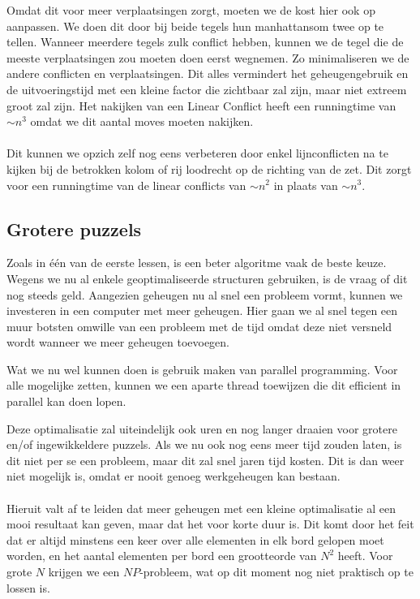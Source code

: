\documentclass[a4paper]{article}
\numberwithin{equation}{section}
\begin{document}
        Omdat dit voor meer verplaatsingen zorgt, moeten we de kost hier ook op aanpassen. We doen dit door bij beide tegels hun manhattansom twee op te tellen. 
        Wanneer meerdere tegels zulk conflict hebben,
        kunnen we de tegel die de meeste verplaatsingen zou moeten doen eerst wegnemen. Zo minimaliseren we de andere conflicten en verplaatsingen. Dit alles vermindert het geheugengebruik en de uitvoeringstijd
        met een kleine factor die zichtbaar zal zijn, maar niet extreem groot zal zijn. Het nakijken van een Linear Conflict heeft een runningtime van $\sim n^3$ omdat we dit aantal moves moeten nakijken.
        \\
        \\Dit kunnen we opzich zelf nog eens verbeteren door enkel lijnconflicten na te kijken bij de betrokken kolom of rij loodrecht op de richting van de zet. Dit zorgt voor een runningtime van de linear conflicts van $\sim n^2$ in plaats van $\sim n^3$. 
    \pagebreak

    \subsection{Grotere puzzels}
    Zoals in \'e\'en van de eerste lessen, is een beter algoritme vaak de beste keuze. Wegens we nu al enkele geoptimaliseerde structuren gebruiken, is de vraag of dit nog steeds geld.
    Aangezien geheugen nu al snel een probleem vormt, kunnen we investeren in een computer met meer geheugen. Hier gaan we al snel tegen een muur botsten omwille van een probleem met de tijd omdat deze niet versneld wordt wanneer we meer geheugen toevoegen.
    
    Wat we nu wel kunnen doen is gebruik maken van parallel programming. Voor alle mogelijke zetten, kunnen we een aparte thread toewijzen die dit effici\:ent in parallel kan doen lopen.

    Deze optimalisatie zal uiteindelijk ook uren en nog langer draaien voor grotere en/of ingewikkeldere puzzels. Als we nu ook nog eens meer tijd zouden laten, is dit niet per se een probleem, maar dit zal snel jaren tijd kosten. Dit is dan weer niet mogelijk is, 
    omdat er nooit genoeg werkgeheugen kan bestaan.
    \\
    \\Hieruit valt af te leiden dat meer geheugen met een kleine optimalisatie al een mooi resultaat kan geven, maar dat het voor korte duur is. Dit komt door het feit dat
    er altijd minstens een keer over alle elementen in elk bord gelopen moet worden, en het aantal elementen per bord een grootteorde van $N^2$ heeft. Voor grote $N$ krijgen we een $NP$-probleem, wat op dit moment nog niet praktisch op te lossen is.

    
    
\end{document}
